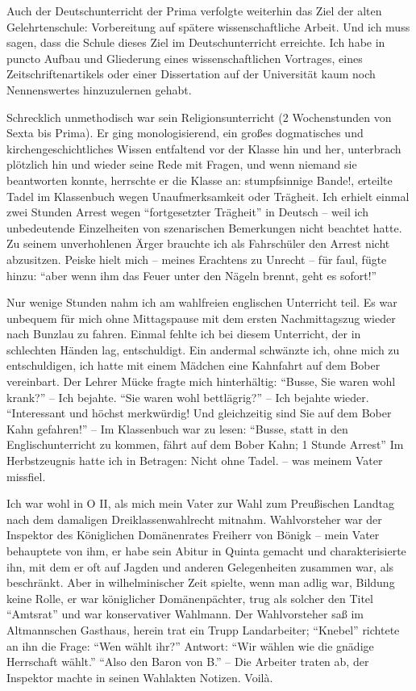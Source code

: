 \documentclass[a5paper,pagesize,10pt,twoside=true]{scrbook}
\begin{document}
Auch der Deutschunterricht der Prima verfolgte weiterhin das Ziel der alten Gelehrtenschule: Vorbereitung auf spätere wissenschaftliche Arbeit. Und ich muss sagen, dass die Schule dieses Ziel im Deutschunterricht erreichte. Ich habe in puncto Aufbau und Gliederung eines wissenschaftlichen Vortrages, eines Zeitschriftenartikels oder einer Dissertation auf der Universität kaum noch Nennenswertes hinzuzulernen gehabt.

Schrecklich unmethodisch war sein Religionsunterricht (2 Wochenstunden von Sexta bis Prima). Er ging monologisierend, ein großes dogmatisches und kirchengeschichtliches Wissen entfaltend vor der Klasse hin und her, unterbrach plötzlich hin und wieder seine Rede mit Fragen, und wenn niemand sie beantworten konnte, herrschte er die Klasse an: stumpfsinnige Bande!, erteilte Tadel im Klassenbuch wegen Unaufmerksamkeit oder Trägheit. Ich erhielt einmal zwei Stunden Arrest wegen \enquote{fortgesetzter Trägheit} in Deutsch -- weil ich unbedeutende Einzelheiten von szenarischen Bemerkungen nicht beachtet hatte. Zu seinem unverhohlenen Ärger brauchte ich als Fahrschüler den Arrest nicht abzusitzen. Peiske hielt mich -- meines Erachtens zu Unrecht -- für faul, fügte hinzu: \enquote{aber wenn ihm das Feuer unter den Nägeln brennt, geht es sofort!}

Nur wenige Stunden nahm ich am wahlfreien englischen Unterricht teil. Es war unbequem für mich ohne Mittagspause mit dem ersten Nachmittagszug wieder nach Bunzlau zu fahren. Einmal fehlte ich bei diesem Unterricht, der in schlechten Händen lag, entschuldigt. Ein andermal schwänzte ich, ohne mich zu entschuldigen, ich hatte mit einem Mädchen eine Kahnfahrt auf dem Bober vereinbart. Der Lehrer Mücke fragte mich hinterhältig: \enquote{Busse, Sie waren wohl krank?} -- Ich bejahte. \enquote{Sie waren wohl bettlägrig?} -- Ich bejahte wieder. \enquote{Interessant und höchst merkwürdig! Und gleichzeitig sind Sie auf dem Bober Kahn gefahren!} -- Im Klassenbuch war zu lesen: \enquote{Busse, statt in den Englischunterricht zu kommen, fährt auf dem Bober Kahn; 1 Stunde Arrest} Im Herbstzeugnis hatte ich in Betragen: Nicht ohne Tadel. -- was meinem Vater missfiel.

Ich war wohl in O II, als mich mein Vater zur Wahl zum Preußischen Landtag nach dem damaligen Dreiklassenwahlrecht mitnahm. Wahlvorsteher war der Inspektor des Königlichen Domänenrates Freiherr von Bönigk -- mein Vater behauptete von ihm, er habe sein Abitur in Quinta gemacht und charakterisierte ihn, mit dem er oft auf Jagden und anderen Gelegenheiten zusammen war, als beschränkt. Aber in wilhelminischer Zeit spielte, wenn man adlig war, Bildung keine Rolle, er war königlicher Domänenpächter, trug als solcher den Titel \enquote{Amtsrat} und war konservativer Wahlmann. Der Wahlvorsteher saß im Altmannschen Gasthaus, herein trat ein Trupp Landarbeiter; \enquote{Knebel} richtete an ihn die Frage: \enquote{Wen wählt ihr?} Antwort: \enquote{Wir wählen wie die gnädige Herrschaft wählt.} \enquote{Also den Baron von B.} -- Die Arbeiter traten ab, der Inspektor machte in seinen Wahlakten Notizen. Voilà.
\end{document}
